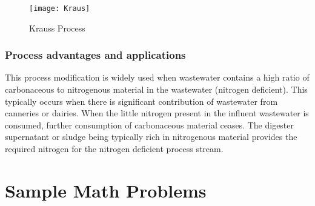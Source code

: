 \begin{figure}[h!]
\begin{center}
\texttt{[image: Kraus]}
\caption{Krauss Process}
\end{center}
\end{figure}

\subsubsection{Process advantages and applications}
This process modification is widely used when wastewater contains a high ratio of carbonaceous to nitrogenous material in the wastewater (nitrogen deficient).  This typically occurs when there is significant contribution of wastewater from canneries or dairies.  When the little nitrogen present in the influent wastewater is consumed, further consumption of carbonaceous material ceases.  The digester supernatant or sludge being typically rich in nitrogenous material provides the required nitrogen for the nitrogen deficient process stream.
\newpage
\section{Sample Math Problems}

